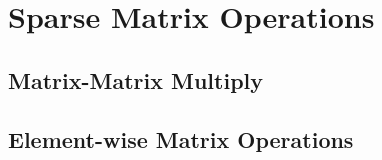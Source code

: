 \section{Sparse Matrix Operations}
\label{sec:ops}

\subsection{Matrix-Matrix Multiply}
\label{subsec:matmult}

\subsection{Element-wise Matrix Operations}
\label{subsec:eltwise}
